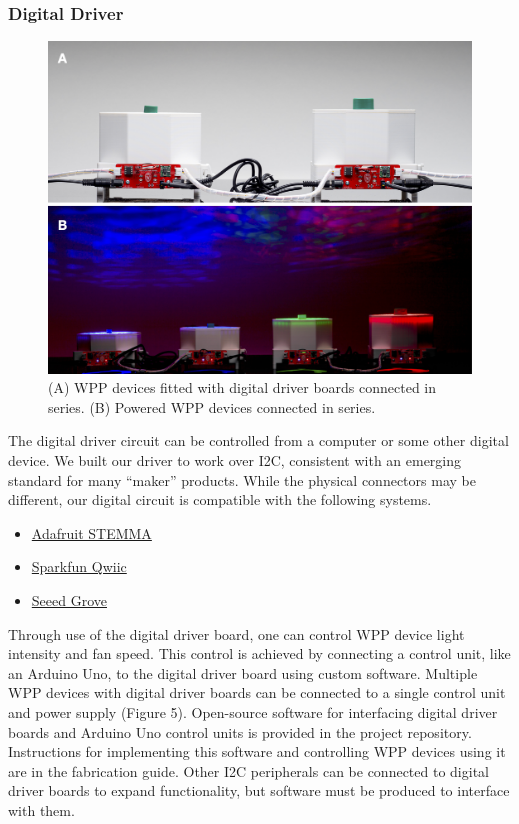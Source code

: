 \documentclass[11pt]{article}
\begin{document}


\subsubsection{Digital Driver} \label{SEC:digital-driver}

\begin{figure}[H]
	\centering
	\includegraphics[width=\textwidth]{"./fig15.png"}
	\caption{(A) WPP devices fitted with digital driver boards connected in series. (B) Powered WPP devices connected in series.}
\end{figure}

The digital driver circuit can be controlled from a computer or some other digital device.
We built our driver to work over I2C, consistent with an emerging standard for many ``maker'' products.
While the physical connectors may be different, our digital circuit is compatible with the following systems.

\begin{itemize}
  \item \href{https://learn.adafruit.com/introducing-adafruit-stemma-qt}{Adafruit STEMMA}
  \item \href{https://www.sparkfun.com/qwiic}{Sparkfun Qwiic}
  \item \href{https://www.seeedstudio.com/category/Grove-c-1003.html}{Seeed Grove}
\end{itemize}

Through use of the digital driver board, one can control WPP device light intensity and fan speed.
This control is achieved by connecting a control unit, like an Arduino Uno, to the digital driver board using custom software.
Multiple WPP devices with digital driver boards can be connected to a single control unit and power supply (Figure 5).
Open-source software for interfacing digital driver boards and Arduino Uno control units is provided in the project repository.
Instructions for implementing this software and controlling WPP devices using it are in the fabrication guide.
Other I2C peripherals can be connected to digital driver boards to expand functionality, but software must be produced to interface with them.
\end{document}
